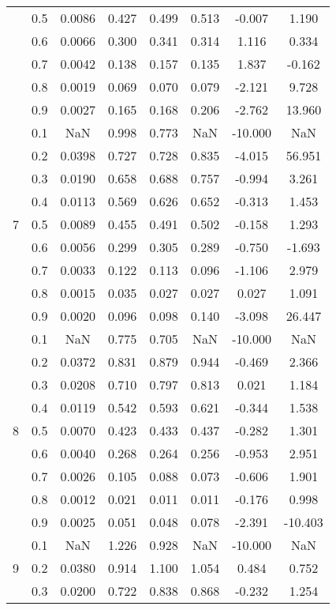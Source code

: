 \documentclass[11pt,a4paper]{report}
\begin{document}
\begin{longtable}{ | c | c || c | c | c | c | c | c | }
 & 0.5 & 0.0086 & 0.427 & 0.499 & 0.513 & -0.007 & 1.190 \\
 & 0.6 & 0.0066 & 0.300 & 0.341 & 0.314 & 1.116 & 0.334 \\
 & 0.7 & 0.0042 & 0.138 & 0.157 & 0.135 & 1.837 & -0.162 \\
 & 0.8 & 0.0019 & 0.069 & 0.070 & 0.079 & -2.121 & 9.728 \\
 & 0.9 & 0.0027 & 0.165 & 0.168 & 0.206 & -2.762 & 13.960 \\
 \hline
\multirow{9}{*}{7} & 0.1 & NaN & 0.998 & 0.773 & NaN & -10.000 & NaN \\
 & 0.2 & 0.0398 & 0.727 & 0.728 & 0.835 & -4.015 & 56.951 \\
 & 0.3 & 0.0190 & 0.658 & 0.688 & 0.757 & -0.994 & 3.261 \\
 & 0.4 & 0.0113 & 0.569 & 0.626 & 0.652 & -0.313 & 1.453 \\
 & 0.5 & 0.0089 & 0.455 & 0.491 & 0.502 & -0.158 & 1.293 \\
 & 0.6 & 0.0056 & 0.299 & 0.305 & 0.289 & -0.750 & -1.693 \\
 & 0.7 & 0.0033 & 0.122 & 0.113 & 0.096 & -1.106 & 2.979 \\
 & 0.8 & 0.0015 & 0.035 & 0.027 & 0.027 & 0.027 & 1.091 \\
 & 0.9 & 0.0020 & 0.096 & 0.098 & 0.140 & -3.098 & 26.447 \\
 \hline
\multirow{9}{*}{8} & 0.1 & NaN & 0.775 & 0.705 & NaN & -10.000 & NaN \\
 & 0.2 & 0.0372 & 0.831 & 0.879 & 0.944 & -0.469 & 2.366 \\
 & 0.3 & 0.0208 & 0.710 & 0.797 & 0.813 & 0.021 & 1.184 \\
 & 0.4 & 0.0119 & 0.542 & 0.593 & 0.621 & -0.344 & 1.538 \\
 & 0.5 & 0.0070 & 0.423 & 0.433 & 0.437 & -0.282 & 1.301 \\
 & 0.6 & 0.0040 & 0.268 & 0.264 & 0.256 & -0.953 & 2.951 \\
 & 0.7 & 0.0026 & 0.105 & 0.088 & 0.073 & -0.606 & 1.901 \\
 & 0.8 & 0.0012 & 0.021 & 0.011 & 0.011 & -0.176 & 0.998 \\
 & 0.9 & 0.0025 & 0.051 & 0.048 & 0.078 & -2.391 & -10.403 \\
 \hline
\multirow{9}{*}{9} & 0.1 & NaN & 1.226 & 0.928 & NaN & -10.000 & NaN \\
 & 0.2 & 0.0380 & 0.914 & 1.100 & 1.054 & 0.484 & 0.752 \\
 & 0.3 & 0.0200 & 0.722 & 0.838 & 0.868 & -0.232 & 1.254 \\

\end{longtable}
\end{document}
